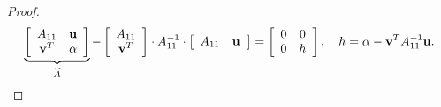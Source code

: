 \begin{theorem}
\begin{proof}
        \[
            \underbrace{\left[
                    \begin{array}{cc}
                        A_{11}     & \mathbf{u} \\
                        \mathbf{v}^T & \alpha
                    \end{array}
                    \right]}_{\widetilde{A}} - \left[
                \begin{array}{c}
                    A_{11} \\
                    \mathbf{v}^T
                \end{array}
                \right]\cdot A_{11}^{-1}\cdot\left[
                \begin{array}{cc}
                    A_{11} & \mathbf{u}
                \end{array}
                \right] = \left[
                \begin{array}{cc}
                    0 & 0 \\
                    0 & h
                \end{array}
                \right], \quad h = \alpha - \mathbf{v}^TA_{11}^{-1}\mathbf{u}.
        \]


\end{proof}
\end{theorem}
